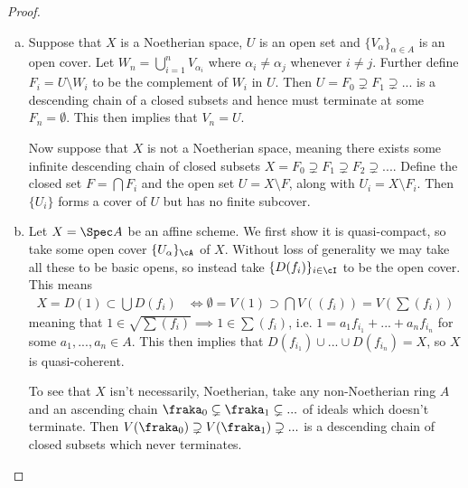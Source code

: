 


\begin{proof}$ $
  \begin{enumerate}[(a)]
    \item Suppose that $X$ is a Noetherian space, $U$ is an open set and $\{V_\alpha\}_{\alpha \in A}$ is an open cover. Let $W_n = \bigcup_{i=1}^n V_{\alpha_i}$ where $\alpha_i \neq \alpha_j$ whenever $i \neq j$. Further define $F_i = U \setminus W_i$ to be the complement of $W_i$ in $U$. Then $U = F_0 \supsetneq F_1 \supsetneq ...$ is a descending chain of a closed subsets and hence must terminate at some $F_n = \emptyset$. This then implies that $V_n = U$.

    Now suppose that $X$ is not a Noetherian space, meaning there exists some infinite descending chain of closed subsets $X = F_0 \supsetneq F_1 \supsetneq F_2 \supsetneq ...$. Define the closed set $F = \bigcap F_i$ and the open set $U = X \setminus F$, along with $U_i = X\setminus F_i$. Then $\{U_i\}$ forms a cover of $U$ but has no finite subcover.
    \item Let $X = \Spec A$ be an affine scheme. We first show it is quasi-compact, so take some open cover $\{U_\alpha\}_{\cA}$ of $X$. Without loss of generality we may take all these to be basic opens, so instead take $\{D(f_i)\}_{i\in \cI}$ to be the open cover. This means
      \begin{align*}
        X = D(1) \subset \bigcup D(f_i) &\iff \emptyset = V(1) \supset \bigcap V((f_i)) = V\left(\sum (f_i)\right)
      \end{align*}
      meaning that $1 \in \sqrt{\sum (f_i)} \implies 1 \in \sum (f_i)$, i.e. $1 = a_1f_{i_1} + ... + a_n f_{i_n}$ for some $a_1,...,a_n \in A$. This then implies that $D(f_{i_1})\cup ... \cup D(f_{i_n}) = X$, so $X$ is quasi-coherent.

      \bigskip

      To see that $X$ isn't necessarily, Noetherian, take any non-Noetherian ring $A$ and an ascending chain $\fraka_0 \subsetneq\fraka_1 \subsetneq ...$ of ideals which doesn't terminate. Then $V(\fraka_0) \supsetneq V(\fraka_1) \supsetneq ...$ is a descending chain of closed subsets which never terminates.
  \end{enumerate}
\end{proof}

